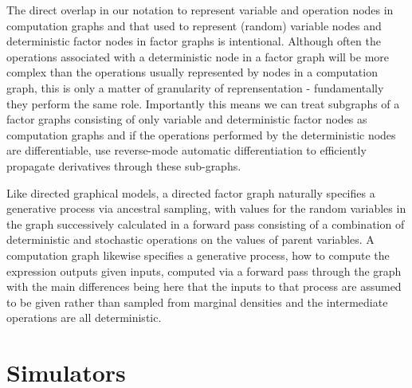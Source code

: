 The direct overlap in our notation to represent variable and operation nodes in computation graphs and that used to represent (random) variable nodes and deterministic factor nodes in factor graphs is intentional. Although often the operations associated with a deterministic node in a factor graph will be more complex than the operations usually represented by nodes in a computation graph, this is only a matter of granularity of reprensentation - fundamentally they perform the same role. Importantly this means we can treat subgraphs of a factor graphs consisting of only variable and deterministic factor nodes as computation graphs and if the operations performed by the deterministic nodes are differentiable, use reverse-mode automatic differentiation to efficiently propagate derivatives through these sub-graphs.


Like directed graphical models, a directed factor graph naturally specifies a generative process via ancestral sampling, with values for the random variables in the graph successively calculated in a forward pass consisting of a combination of deterministic and stochastic operations on the values of parent variables. A computation graph likewise specifies a generative process, how to compute the expression outputs given inputs, computed via a forward pass through the graph with the main differences being here that the inputs to that process are assumed to be given rather than sampled from marginal densities and the intermediate operations are all deterministic.

\section{Simulators}\label{subsec:simulators}


